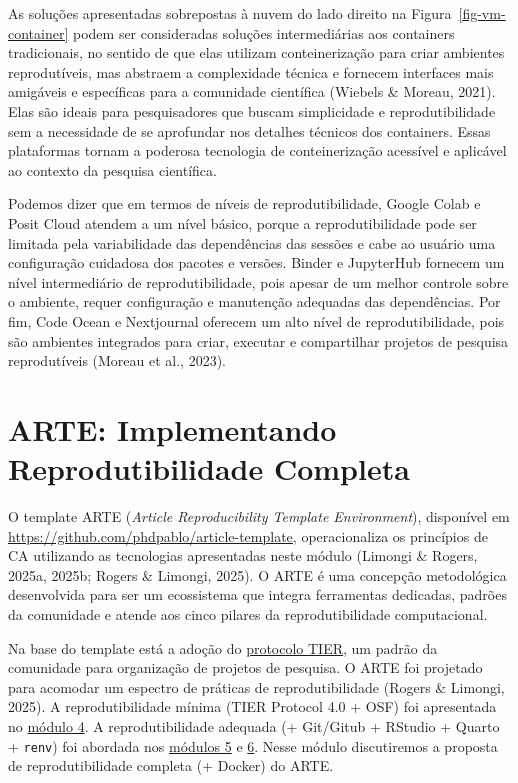 \documentclass[
  a4paper,
]{book}
\begin{document}
As soluções apresentadas sobrepostas à nuvem do lado direito na
Figura~\ref{fig-vm-container} podem ser consideradas soluções
intermediárias aos containers tradicionais, no sentido de que elas
utilizam conteinerização para criar ambientes reprodutíveis, mas
abstraem a complexidade técnica e fornecem interfaces mais amigáveis e
específicas para a comunidade científica (Wiebels \& Moreau, 2021). Elas
são ideais para pesquisadores que buscam simplicidade e
reprodutibilidade sem a necessidade de se aprofundar nos detalhes
técnicos dos containers. Essas plataformas tornam a poderosa tecnologia
de conteinerização acessível e aplicável ao contexto da pesquisa
científica.

Podemos dizer que em termos de níveis de reprodutibilidade, Google Colab
e Posit Cloud atendem a um nível básico, porque a reprodutibilidade pode
ser limitada pela variabilidade das dependências das sessões e cabe ao
usuário uma configuração cuidadosa dos pacotes e versões. Binder e
JupyterHub fornecem um nível intermediário de reprodutibilidade, pois
apesar de um melhor controle sobre o ambiente, requer configuração e
manutenção adequadas das dependências. Por fim, Code Ocean e Nextjournal
oferecem um alto nível de reprodutibilidade, pois são ambientes
integrados para criar, executar e compartilhar projetos de pesquisa
reprodutíveis (Moreau et al., 2023).

\section{ARTE: Implementando Reprodutibilidade
Completa}\label{arte-implementando-reprodutibilidade-completa}

O template ARTE (\emph{Article Reproducibility Template Environment}),
disponível em \url{https://github.com/phdpablo/article-template},
operacionaliza os princípios de CA utilizando as tecnologias
apresentadas neste módulo (Limongi \& Rogers, 2025a, 2025b; Rogers \&
Limongi, 2025). O ARTE é uma concepção metodológica desenvolvida para
ser um ecossistema que integra ferramentas dedicadas, padrões da
comunidade e atende aos cinco pilares da reprodutibilidade
computacional.

Na base do template está a adoção do
\href{https://www.projecttier.org/tier-protocol/protocol-4-0/}{protocolo
TIER}, um padrão da comunidade para organização de projetos de pesquisa.
O ARTE foi projetado para acomodar um espectro de práticas de
reprodutibilidade (Rogers \& Limongi, 2025). A reprodutibilidade mínima
(TIER Protocol 4.0 + OSF) foi apresentada no
\href{04-project.html}{módulo 4}. A reprodutibilidade adequada (+
Git/Gitub + RStudio + Quarto + \texttt{renv}) foi abordada nos
\href{05-git.html}{módulos 5} e \href{06-quarto.html}{6}. Nesse módulo
discutiremos a proposta de reprodutibilidade completa (+ Docker) do
ARTE.
\end{document}
